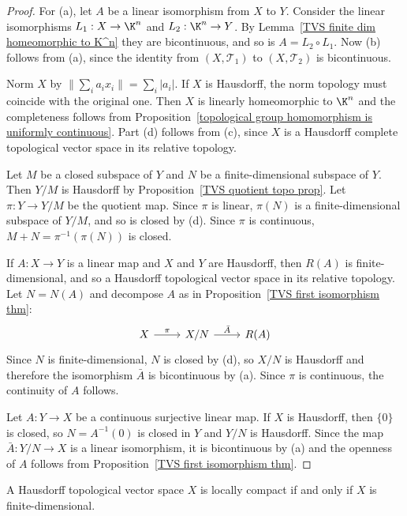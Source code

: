 \begin{proof}
For (a), let $A$ be a linear isomorphism from $X$ to $Y$. Consider the linear isomorphisms $L_1:X\to\K^n$ and $L_2:\K^n\to Y$. By Lemma~\ref{TVS finite dim homeomorphic to K^n} they are bicontinuous, and so is $A=L_2\circ L_1$. Now (b) follows from (a), since the identity from $(X,\mathcal{T}_1)$ to $(X,\mathcal{T}_2)$ is bicontinuous.\par
Norm $X$ by $\|\sum_ia_ix_i\|=\sum_i|a_i|$. If $X$ is Hausdorff, the norm topology must coincide with the original one. Then $X$ is linearly homeomorphic to $\K^n$ and the completeness follows from Proposition~\ref{topological group homomorphism is uniformly continuous}. Part (d) follows from (c), since $X$ is a Hausdorff complete topological vector space in its relative topology.\par
Let $M$ be a closed subspace of $Y$ and $N$ be a finite-dimensional subspace of $Y$. Then $Y/M$ is Hausdorff by Proposition~\ref{TVS quotient topo prop}. Let $\pi:Y\to Y/M$ be the quotient map. Since $\pi$ is linear, $\pi(N)$ is a finite-dimensional subspace of $Y/M$, and so is closed by (d). Since $\pi$ is continuous, $M+N=\pi^{-1}(\pi(N))$ is closed.\par
If $A:X\to Y$ is a linear map and $X$ and $Y$ are Hausdorff, then $R(A)$ is finite-dimensional, and so a Hausdorff topological vector space in its relative topology. Let $N=N(A)$ and decompose $A$ as in Proposition~\ref{TVS first isomorphism thm}:
\[\begin{tikzcd}
X\ar[r,"\pi"]&X/N\ar[r,"\bar{A}"]&R(A)
\end{tikzcd}\]
Since $N$ is finite-dimensional, $N$ is closed by (d), so $X/N$ is Hausdorff and therefore the isomorphism $\bar{A}$ is bicontinuous by (a). Since $\pi$ is continuous, the continuity of $A$ follows.\par
Let $A:Y\to X$ be a continuous surjective linear map. If $X$ is Hausdorff, then $\{0\}$ is closed, so $N=A^{-1}(0)$ is closed in $Y$ and $Y/N$ is Hausdorff. Since the map $\bar{A}:Y/N\to X$ is a linear isomorphism, it is bicontinuous by (a) and the openness of $A$ follows from Proposition~\ref{TVS first isomorphism thm}.
\end{proof}
\begin{theorem}\label{TVS locally compact}
A Hausdorff topological vector space $X$ is locally compact if and only if $X$ is finite-dimensional.
\end{theorem}
